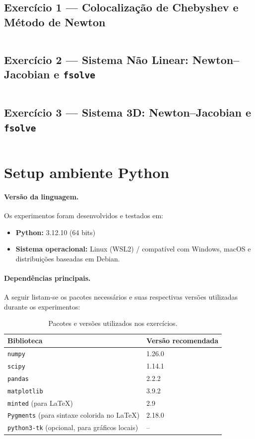 \documentclass[12pt,a4paper]{article}
\begin{document}
\subsection{Exercício 1 — Colocalização de Chebyshev e Método de Newton}
\inputminted[fontsize=\footnotesize,breaklines]{python}{code/ex1_cheb_newton.py}

\subsection{Exercício 2 — Sistema Não Linear: Newton--Jacobian e \texttt{fsolve}}
\inputminted[fontsize=\footnotesize,breaklines]{python}{code/ex2_newton_vs_fsolve.py}

\subsection{Exercício 3 — Sistema 3D: Newton--Jacobian e \texttt{fsolve}}
\inputminted[fontsize=\footnotesize,breaklines]{python}{code/ex3_newton3d_vs_fsolve.py}

\section{Setup ambiente Python}

\paragraph{Versão da linguagem.}
Os experimentos foram desenvolvidos e testados em:
\begin{itemize}
  \item \textbf{Python:} 3.12.10 (64 bits)
  \item \textbf{Sistema operacional:} Linux (WSL2) / compatível com Windows, macOS e distribuições baseadas em Debian.
\end{itemize}

\paragraph{Dependências principais.}
A seguir listam-se os pacotes necessários e suas respectivas versões utilizadas durante os experimentos:

\begin{table}[H]
\centering
\caption{Pacotes e versões utilizados nos exercícios.}
\begin{tabular}{l l}
\hline
\textbf{Biblioteca} & \textbf{Versão recomendada} \\
\hline
\texttt{numpy} & 1.26.0 \\
\texttt{scipy} & 1.14.1 \\
\texttt{pandas} & 2.2.2 \\
\texttt{matplotlib} & 3.9.2 \\
\texttt{minted} (para LaTeX) & 2.9 \\
\texttt{Pygments} (para sintaxe colorida no LaTeX) & 2.18.0 \\
\texttt{python3-tk} (opcional, para gráficos locais) & -- \\
\hline
\end{tabular}
\end{table}
\end{document}
